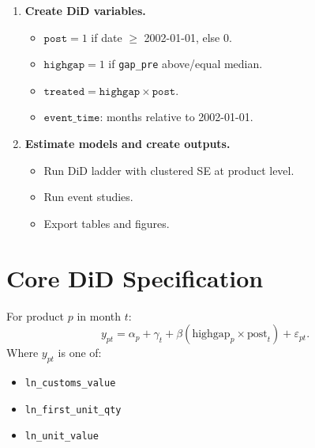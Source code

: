 \documentclass[11pt]{article}
\begin{document}
\begin{enumerate}[leftmargin=*]
  \item \textbf{Create DiD variables.}
        \begin{itemize}[leftmargin=*]
          \item \(\texttt{post}=1\) if date \(\ge\) 2002-01-01, else 0.
          \item \(\texttt{highgap}=1\) if \texttt{gap\_pre} above/equal median.
          \item \(\texttt{treated}=\texttt{highgap}\times\texttt{post}\).
          \item \(\texttt{event\_time}\): months relative to 2002-01-01.
        \end{itemize}

  \item \textbf{Estimate models and create outputs.}
        \begin{itemize}[leftmargin=*]
          \item Run DiD ladder with clustered SE at product level.
          \item Run event studies.
          \item Export tables and figures.
        \end{itemize}
\end{enumerate}

\section{Core DiD Specification}
For product \(p\) in month \(t\):
\[
  y_{pt} = \alpha_p + \gamma_t + \beta(\text{highgap}_p \times \text{post}_t) + \varepsilon_{pt}.
\]
Where \(y_{pt}\) is one of:
\begin{itemize}[leftmargin=*]
  \item \texttt{ln\_customs\_value}
  \item \texttt{ln\_first\_unit\_qty}
  \item \texttt{ln\_unit\_value}
\end{itemize}
\end{document}
